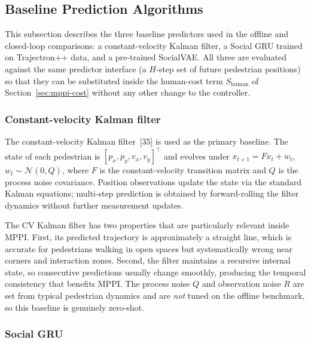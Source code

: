 \documentclass[12pt, a4paper]{article}
\begin{document}
\subsection{Baseline Prediction Algorithms}
\label{sec:baselines}

This subsection describes the three baseline predictors used in the offline and closed-loop comparisons: a constant-velocity Kalman filter, a Social GRU trained on Trajectron++ data, and a pre-trained SocialVAE. All three are evaluated against the same predictor interface (a $H$-step set of future pedestrian positions) so that they can be substituted inside the human-cost term $S_{\mathrm{human}}$ of Section~\ref{sec:mppi-cost} without any other change to the controller.

\subsubsection{Constant-velocity Kalman filter}
\label{sec:kalman}

The constant-velocity Kalman filter~[35] is used as the primary baseline. The state of each pedestrian is $[p_x,p_y,v_x,v_y]^{\!\top}$ and evolves under
$x_{t+1}=Fx_t+w_t$, $w_t\sim\mathcal{N}(0,Q)$,
where $F$ is the constant-velocity transition matrix and $Q$ is the process noise covariance. Position observations update the state via the standard Kalman equations; multi-step prediction is obtained by forward-rolling the filter dynamics without further measurement updates.

The CV Kalman filter has two properties that are particularly relevant inside MPPI. First, its predicted trajectory is approximately a straight line, which is accurate for pedestrians walking in open spaces but systematically wrong near corners and interaction zones. Second, the filter maintains a recursive internal state, so consecutive predictions usually change smoothly, producing the temporal consistency that benefits MPPI. The process noise $Q$ and observation noise $R$ are set from typical pedestrian dynamics and are \emph{not} tuned on the offline benchmark, so this baseline is genuinely zero-shot.

\subsubsection{Social GRU}
\label{sec:learned-baselines}
\end{document}
